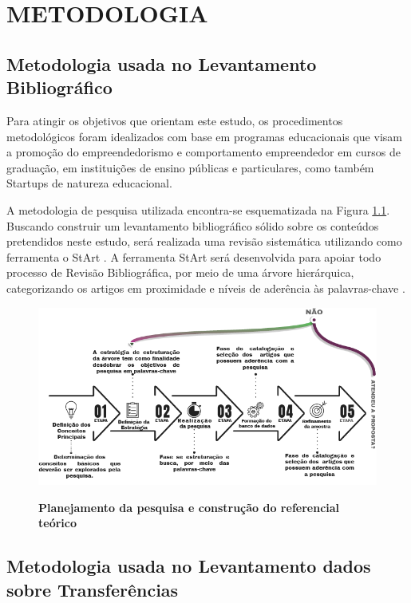 \chapter{METODOLOGIA}

\section{Metodologia usada no Levantamento Bibliográfico}


Para atingir os objetivos que orientam este estudo, os procedimentos metodológicos foram idealizados com base em programas educacionais que visam a promoção do empreendedorismo e comportamento empreendedor em cursos de graduação, em instituições de ensino públicas e particulares, como também Startups de natureza educacional.


A metodologia de pesquisa utilizada encontra-se esquematizada na Figura \ref{figura_referencial}. Buscando construir um levantamento bibliográfico sólido sobre os conteúdos pretendidos neste estudo, será realizada uma revisão sistemática utilizando como ferramenta o StArt \cite{lapes_start_2016}. A ferramenta StArt será desenvolvida para apoiar todo processo de Revisão Bibliográfica, por meio de uma árvore hierárquica, categorizando os artigos em proximidade e níveis de aderência às palavras-chave \cite{hernandes_avaliacao_2010}.


\begin{figure}[H]
\centering
\caption{\textbf{Planejamento da pesquisa e construção do referencial teórico}}
\includegraphics[scale=0.6]{Imagens/fases_pesquisa_bibliografica.png}
\label{figura_referencial}
\end{figure}

\section{Metodologia usada no Levantamento dados sobre Transferências}

